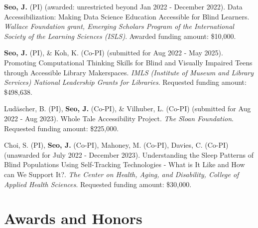 \documentclass[11pt,a4paper,]{awesome-cv}
\begin{document}
\textbf{Seo, J.} (PI) (awarded: unrestricted beyond Jan 2022 - December
2022). Data Accessibilization: Making Data Science Education Accessible
for Blind Learners. \emph{Wallace Foundation grant, Emerging Scholars
  Program of the International Society of the Learning Sciences (ISLS)}.
Awarded funding amount: \$10,000.

\textbf{Seo, J.} (PI), \& Koh, K. (Co-PI) (submitted for Aug 2022 - May
2025). Promoting Computational Thinking Skills for Blind and Visually
Impaired Teens through Accessible Library Makerspaces. \emph{IMLS
  (Institute of Museum and Library Services) National Leadership Grants
  for Libraries}. Requested funding amount: \$498,638.

Ludäscher, B. (PI), \textbf{Seo, J.} (Co-PI), \& Vilhuber, L. (Co-PI)
(submitted for Aug 2022 - Aug 2023). Whole Tale Accessibility Project.
\emph{The Sloan Foundation}. Requested funding amount: \$225,000.

Choi, S. (PI), \textbf{Seo, J.} (Co-PI), Mahoney, M. (Co-PI), Davies, C.
(Co-PI) (unawarded for July 2022 - December 2023). Understanding the
Sleep Patterns of Blind Populations Using Self-Tracking Technologies -
What is It Like and How can We Support It?. \emph{The Center on Health,
  Aging, and Disability, College of Applied Health Sciences}. Requested
funding amount: \$30,000.

\hypertarget{awards-and-honors}{%
  \section{Awards and Honors}\label{awards-and-honors}}
\end{document}
